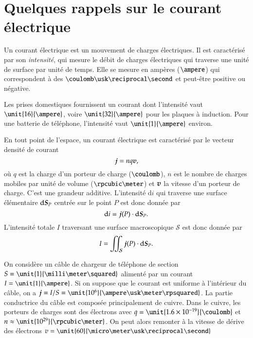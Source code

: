 \section{Quelques rappels sur le courant électrique}

\begin{defn}
Un courant électrique est un mouvement de charges électriques. Il est caractérisé 
par son \emph{intensité}, qui mesure le débit de charges électriques qui traverse
une unité de surface par unité de temps. Elle se mesure en ampères ($\ampere$)
qui correspondent à des $\coulomb \usk \reciprocal \second$ et peut-être 
positive ou négative.
\end{defn}

\begin{exemple}
	Les prises domestiques fournissent un courant dont l'intensité vaut
	$\unit{16}{\ampere}$, voire $\unit{32}{\ampere}$ pour les plaques à induction. 
	Pour une batterie de téléphone, l'intensité vaut
	$\unit{1}{\ampere}$ environ.
\end{exemple}

\begin{defn}
	En tout point de l'espace, un courant électrique est caractérisé par le vecteur 
densité de courant  
	\begin{equation}
		\vecj = n q \vecv,
		\label{eq:jnqv}
	\end{equation}
	où $q$ est la charge d'un porteur de charge ($\coulomb$), $n$ est le
	nombre de charges mobiles par unité de volume ($\rpcubic \meter$) et
	$\vecv$ la vitesse d'un porteur de charge. C'est une grandeur additive.
	L'intensité $\mathrm{d}i$
	qui traverse une surface élémentaire $\ds_P$ centrée sur le point 
	$P$ est donc donnée par 
	\begin{equation}
		\mathrm{d}i = \vecj(P) \cdot \ds_P.
	\end{equation}
	L'intensité totale $I$ traversant une surface macroscopique $\mathcal{S}$
	est donc donnée par 
	\begin{equation}
		I = \iint_\mathcal{S} \vecj(P) \cdot \ds_P.
	\end{equation}
\end{defn}

\begin{exemple}
	On considère un câble de chargeur de téléphone de section $S = \unit{1}
	{\milli \meter \squared}$ alimenté par un courant $I = \unit{1}{\ampere}$.
	Si on suppose que le courant est uniforme à l'intérieur du câble, on a
	$\vecj = I/S = \unit{10^6}{\ampere \usk \meter \rpsquared}$. La partie 
	conductrice du câble est composée principalement de cuivre. Dans le cuivre, 
	les porteurs de charges sont des électrons avec $q = \unit{1.6 \times 10^{-19}
	}{\coulomb}$ et $n \approx \unit{10^{29}}{\rpcubic \meter}$. On peut alors remonter
	à la vitesse de dérive des électrons $v = \unit{60}
	{\micro \meter \usk \reciprocal \second}$
\end{exemple}

